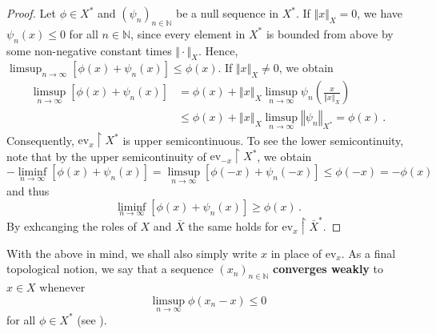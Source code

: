 \documentclass[
	paper=A4,
	pagesize=auto,
	fontsize=12pt
]{scrartcl}
\theoremstyle{plain}
\theoremstyle{remark}
\theoremstyle{definition}
\begin{document}
\begin{proof}
Let $\phi \in X^*$ and $(\psi_n)_{n \in \mathbb{N}}$ be a null sequence in $X^*$.
If $\Vert x \Vert_{X} = 0$, we have $\psi_n(x) \le 0$ for all $n \in \mathbb{N}$, since every element in $X^*$ is bounded from above by some non-negative constant times $\Vert \cdot \Vert_{X}$.
Hence, $\limsup_{n \to \infty}  [ \phi( x ) + \psi_n( x ) ] \le \phi( x )$.
If $\Vert x \Vert_{X}  \neq 0$, we obtain
%
\begin{equation}
\begin{aligned}
\limsup_{n \to \infty} \left[ \phi \left( x \right) + \psi_n \left( x \right) \right]
&=
\phi \left( x \right) + \left\Vert x \right\Vert_{X} \limsup_{n \to \infty} \psi_n \left( \frac{x}{\left\Vert x \right\Vert_{X} } \right) \\
&\le
\phi \left( x \right) + \left\Vert x \right\Vert_{X} \limsup_{n \to \infty}  \left\Vert \psi_n \right\Vert_{X^*}
=
\phi \left( x \right) \, .
\end{aligned}
\end{equation}
%
Consequently, $\mathrm{ev}_x \upharpoonright X^*$ is upper semicontinuous.
To see the lower semicontinuity, note that by the upper semicontinuity of $\mathrm{ev}_{-x} \upharpoonright X^*$, we obtain
%
\begin{equation}
- \liminf_{n \to \infty} \left[ \phi \left( x \right) + \psi_n \left( x \right) \right]
=
\limsup_{n \to \infty} \left[ \phi \left( -x \right) + \psi_n \left( -x \right) \right]
\le
\phi \left( -x \right)
=
- \phi \left( x \right)
\end{equation}
%
and thus
%
\begin{equation}
\liminf_{n \to \infty} \left[ \phi \left( x \right) + \psi_n \left( x \right) \right]
\ge
\phi \left( x \right) \, .
\end{equation}
%
By exhcanging the roles of $X$ and $\bar{X}$ the same holds for $\mathrm{ev}_x \upharpoonright \bar{X}^*$.
\end{proof}
%
With the above  in mind, we shall also simply write $x$ in place of $\mathrm{ev}_x$.
As a final topological notion, we say that a sequence $(x_n)_{n \in \mathbb{N}}$ \textbf{converges weakly} to $x \in X$ whenever
%
\begin{equation}
\limsup_{n \to \infty} \phi \left( x_n - x \right) \le 0
\end{equation}
%
for all $\phi \in X^*$ (see \cite[Proposition 2.4.33]{src:Cobzaş:FunctionalAnalysisinAsymmetricNormedSpaces}).
%
\end{document}
